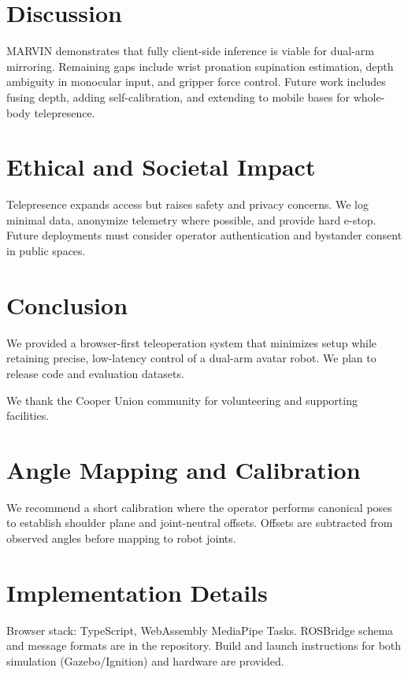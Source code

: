 \documentclass[sigconf]{acmart}
\begin{document}

\section{Discussion}
MARVIN demonstrates that fully client-side inference is viable for dual-arm mirroring. Remaining gaps include wrist pronation supination estimation, depth ambiguity in monocular input, and gripper force control. Future work includes fusing depth, adding self-calibration, and extending to mobile bases for whole-body telepresence.

\section{Ethical and Societal Impact}
Telepresence expands access but raises safety and privacy concerns. We log minimal data, anonymize telemetry where possible, and provide hard e-stop. Future deployments must consider operator authentication and bystander consent in public spaces.

\section{Conclusion}
We provided a browser-first teleoperation system that minimizes setup while retaining precise, low-latency control of a dual-arm avatar robot. We plan to release code and evaluation datasets.

\begin{acks}
We thank the Cooper Union community for volunteering and supporting facilities.
\end{acks}




\appendix
\section{Angle Mapping and Calibration}
We recommend a short calibration where the operator performs canonical poses to establish shoulder plane and joint-neutral offsets. Offsets are subtracted from observed angles before mapping to robot joints.

\section{Implementation Details}
Browser stack: TypeScript, WebAssembly MediaPipe Tasks. ROSBridge schema and message formats are in the repository. Build and launch instructions for both simulation (Gazebo/Ignition) and hardware are provided.
\end{document}
